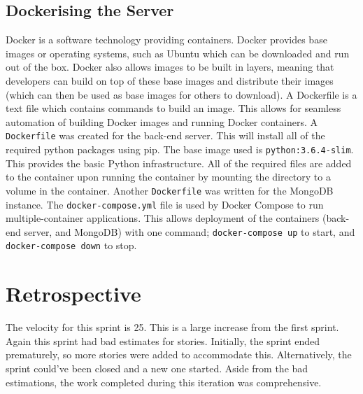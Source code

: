 \subsection{Dockerising the Server}
Docker is a software technology providing containers. Docker provides base images or operating systems, such as Ubuntu which can be downloaded and run out of the box. Docker also allows images to be built in layers, meaning that developers can build on top of these base images and distribute their images (which can then be used as base images for others to download). A Dockerfile is a text file which contains commands to build an image. This allows for seamless automation of building Docker images and running Docker containers. A \texttt{Dockerfile} was created for the back-end server. This will install all of the required python packages using pip. The base image used is \texttt{python:3.6.4-slim}. This provides the basic Python infrastructure. All of the required files are added to the container upon running the container by mounting the directory to a volume in the container. Another \texttt{Dockerfile} was written for the MongoDB instance. The \texttt{docker-compose.yml} file is used by Docker Compose to run multiple-container applications. This allows deployment of the containers (back-end server, and MongoDB) with one command; \texttt{docker-compose up} to start, and \texttt{docker-compose down} to stop.

\section{Retrospective}
The velocity for this sprint is 25. This is a large increase from the first sprint. Again this sprint had bad estimates for stories. Initially, the sprint ended prematurely, so more stories were added to accommodate this. Alternatively, the sprint could've been closed and a new one started. Aside from the bad estimations, the work completed during this iteration was comprehensive.
